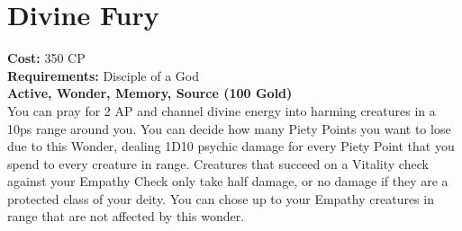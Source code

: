 \section{Divine Fury}
\textbf{Cost:} 350 CP\\
\textbf{Requirements:} Disciple of a God\\
\textbf{Active, Wonder, Memory, Source (100 Gold)}\\
You can pray for 2 AP and channel divine energy into harming creatures in a 10ps range around you. You can decide how many Piety Points you want to lose due to this Wonder, dealing 1D10 psychic damage for every Piety Point that you spend to every creature in range. Creatures that succeed on a Vitality check against your Empathy Check only take half damage, or no damage if they are a protected class of your deity. You can chose up to your Empathy creatures in range that are not affected by this wonder.\\
\\